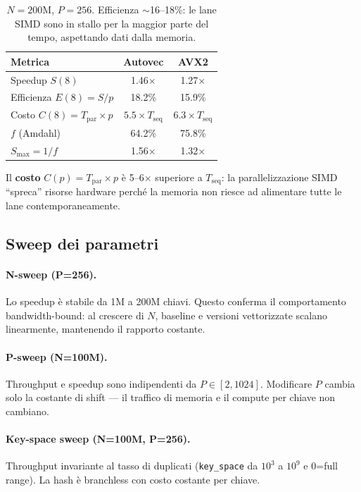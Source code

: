 \documentclass[11pt,a4paper]{article}
\begin{document}
\begin{table}[h]
\centering
\begin{tabular}{@{}lcc@{}}
\toprule
\textbf{Metrica} & \textbf{Autovec} & \textbf{AVX2} \\
\midrule
Speedup $S(8)$ & 1.46$\times$ & 1.27$\times$ \\
Efficienza $E(8) = S/p$ & 18.2\% & 15.9\% \\
Costo $C(8) = T_\text{par} \times p$ & $5.5 \times T_\text{seq}$ & $6.3 \times T_\text{seq}$ \\
$f$ (Amdahl) & 64.2\% & 75.8\% \\
$S_\text{max} = 1/f$ & 1.56$\times$ & 1.32$\times$ \\
\bottomrule
\end{tabular}
\caption{$N=200$M, $P=256$. Efficienza $\sim$16--18\%: le lane SIMD sono in stallo per la maggior parte del tempo, aspettando dati dalla memoria.}
\end{table}

Il \textbf{costo} $C(p) = T_\text{par} \times p$ è 5--6$\times$ superiore a $T_\text{seq}$: la parallelizzazione SIMD ``spreca'' risorse hardware perché la memoria non riesce ad alimentare tutte le lane contemporaneamente.

\subsection{Sweep dei parametri}

\paragraph{N-sweep (P=256).} Lo speedup è stabile da 1M a 200M chiavi. Questo conferma il comportamento bandwidth-bound: al crescere di $N$, baseline e versioni vettorizzate scalano linearmente, mantenendo il rapporto costante.

\paragraph{P-sweep (N=100M).} Throughput e speedup sono indipendenti da $P \in [2, 1024]$. Modificare $P$ cambia solo la costante di shift --- il traffico di memoria e il compute per chiave non cambiano.

\paragraph{Key-space sweep (N=100M, P=256).} Throughput invariante al tasso di duplicati (\texttt{key\_space} da $10^3$ a $10^9$ e 0=full range). La hash è branchless con costo costante per chiave.
\end{document}
